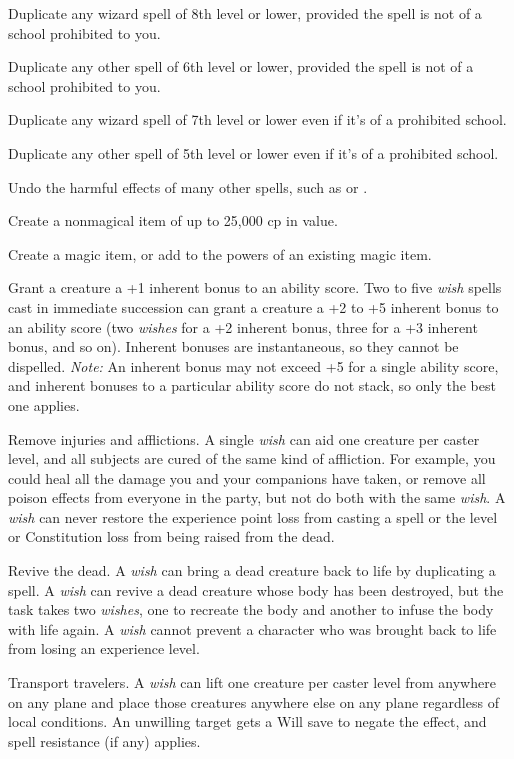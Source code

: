 {	\begin{itemize*}
	\item Duplicate any wizard spell of 8th level or lower, provided the spell is not of a school prohibited to you.
	\item Duplicate any other spell of 6th level or lower, provided the spell is not of a school prohibited to you.
	\item Duplicate any wizard spell of 7th level or lower even if it's of a prohibited school.
	\item Duplicate any other spell of 5th level or lower even if it's of a prohibited school.
	\item Undo the harmful effects of many other spells, such as  or .
	\item Create a nonmagical item of up to 25,000 cp in value.
	\item Create a magic item, or add to the powers of an existing magic item.
	\item Grant a creature a +1 inherent bonus to an ability score. Two to five \emph{wish} spells cast in immediate succession can grant a creature a +2 to +5 inherent bonus to an ability score (two \emph{wishes} for a +2 inherent bonus, three for a +3 inherent bonus, and so on). Inherent bonuses are instantaneous, so they cannot be dispelled. \textit{Note:} An inherent bonus may not exceed +5 for a single ability score, and inherent bonuses to a particular ability score do not stack, so only the best one applies.
	\item Remove injuries and afflictions. A single \emph{wish} can aid one creature per caster level, and all subjects are cured of the same kind of affliction. For example, you could heal all the damage you and your companions have taken, or remove all poison effects from everyone in the party, but not do both with the same \emph{wish}. A \emph{wish} can never restore the experience point loss from casting a spell or the level or Constitution loss from being raised from the dead.
	\item Revive the dead. A \emph{wish} can bring a dead creature back to life by duplicating a  spell. A \emph{wish} can revive a dead creature whose body has been destroyed, but the task takes two \emph{wishes}, one to recreate the body and another to infuse the body with life again. A \emph{wish} cannot prevent a character who was brought back to life from losing an experience level.
	\item Transport travelers. A \emph{wish} can lift one creature per caster level from anywhere on any plane and place those creatures anywhere else on any plane regardless of local conditions. An unwilling target gets a Will save to negate the effect, and spell resistance (if any) applies.

\end{itemize*}}
